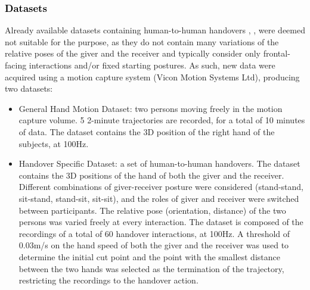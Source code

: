 \documentclass[lettersize,journal]{IEEEtran}
\begin{document}
\subsubsection{\textcolor{black}{Datasets}}
\noindent
Already available datasets containing human-to-human handovers \cite{carfi_multi-sensor_2018}, \cite{chan_affordance_2020}, \cite{wiederhold_hoh_2023} were deemed not suitable for the purpose, as they do not contain many variations of the relative poses of the giver and the receiver and typically consider only frontal-facing interactions and/or fixed starting postures.
As such, new data were acquired using a motion capture system (Vicon Motion Systems Ltd), producing two datasets:
\begin{itemize}
    \item General Hand Motion Dataset: two persons moving freely in the motion capture volume. 5 2-minute trajectories are recorded, for a total of 10 minutes of data. The dataset contains the 3D position of the right hand of the subjects, at 100Hz.
    \item Handover Specific Dataset: a set of human-to-human handovers. The dataset contains the 3D positions of the hand of both the giver and the receiver. Different combinations of giver-receiver posture were considered (stand-stand, sit-stand, stand-sit, sit-sit), and the roles of giver and receiver were switched between participants. The relative pose (orientation, distance) of the two persons was varied freely at every interaction. The dataset is composed of the recordings of a total of 60 handover interactions, at 100Hz. A threshold of 0.03m/s on the hand speed of both the giver and the receiver was used to determine the initial cut point and the point with the smallest distance between the two hands was selected as the termination of the trajectory, restricting the recordings to the handover action. 
\end{itemize}
\end{document}
